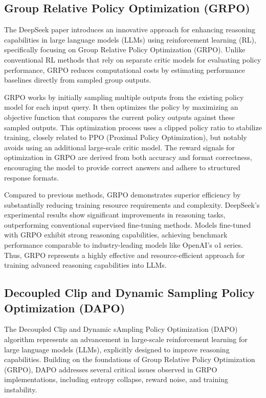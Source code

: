 \documentclass[11pt, oneside]{article}   	%
\begin{document}
\subsection*{Group Relative Policy Optimization (GRPO) \cite{deepseekai2025deepseekr1incentivizingreasoningcapability}}

The DeepSeek paper introduces an innovative approach for enhancing reasoning capabilities in large language models (LLMs) using reinforcement learning (RL), specifically focusing on Group Relative Policy Optimization (GRPO). Unlike conventional RL methods that rely on separate critic models for evaluating policy performance, GRPO reduces computational costs by estimating performance baselines directly from sampled group outputs.

GRPO works by initially sampling multiple outputs from the existing policy model for each input query. It then optimizes the policy by maximizing an objective function that compares the current policy outputs against these sampled outputs. This optimization process uses a clipped policy ratio to stabilize training, closely related to PPO (Proximal Policy Optimization), but notably avoids using an additional large-scale critic model. The reward signals for optimization in GRPO are derived from both accuracy and format correctness, encouraging the model to provide correct answers and adhere to structured response formats.

Compared to previous methods, GRPO demonstrates superior efficiency by substantially reducing training resource requirements and complexity. DeepSeek’s experimental results show significant improvements in reasoning tasks, outperforming conventional supervised fine-tuning methods. Models fine-tuned with GRPO exhibit strong reasoning capabilities, achieving benchmark performance comparable to industry-leading models like OpenAI's o1 series. Thus, GRPO represents a highly effective and resource-efficient approach for training advanced reasoning capabilities into LLMs.

\subsection*{Decoupled Clip and Dynamic Sampling Policy Optimization (DAPO) \cite{yu2025dapoopensourcellmreinforcement}}

The Decoupled Clip and Dynamic sAmpling Policy Optimization (DAPO) algorithm represents an advancement in large-scale reinforcement learning for large language models (LLMs), explicitly designed to improve reasoning capabilities. Building on the foundations of Group Relative Policy Optimization (GRPO), DAPO addresses several critical issues observed in GRPO implementations, including entropy collapse, reward noise, and training instability.
\end{document}
